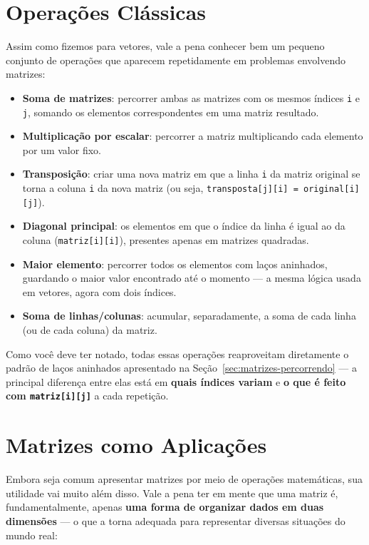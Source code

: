 \section{Operações Clássicas}
\label{sec:matrizes-operacoes}

Assim como fizemos para vetores, vale a pena conhecer bem um pequeno conjunto de operações que aparecem repetidamente em problemas envolvendo matrizes:

\begin{itemize}
    \item \textbf{Soma de matrizes}: percorrer ambas as matrizes com os mesmos índices \texttt{i} e \texttt{j}, somando os elementos correspondentes em uma matriz resultado.
    \item \textbf{Multiplicação por escalar}: percorrer a matriz multiplicando cada elemento por um valor fixo.
    \item \textbf{Transposição}: criar uma nova matriz em que a linha \texttt{i} da matriz original se torna a coluna \texttt{i} da nova matriz (ou seja, \texttt{transposta[j][i] = original[i][j]}).
    \item \textbf{Diagonal principal}: os elementos em que o índice da linha é igual ao da coluna (\texttt{matriz[i][i]}), presentes apenas em matrizes quadradas.
    \item \textbf{Maior elemento}: percorrer todos os elementos com laços aninhados, guardando o maior valor encontrado até o momento — a mesma lógica usada em vetores, agora com dois índices.
    \item \textbf{Soma de linhas/colunas}: acumular, separadamente, a soma de cada linha (ou de cada coluna) da matriz.
\end{itemize}

Como você deve ter notado, todas essas operações reaproveitam diretamente o padrão de laços aninhados apresentado na Seção~\ref{sec:matrizes-percorrendo} — a principal diferença entre elas está em \textbf{quais índices variam} e \textbf{o que é feito com \texttt{matriz[i][j]}} a cada repetição.

\section{Matrizes como Aplicações}

Embora seja comum apresentar matrizes por meio de operações matemáticas, sua utilidade vai muito além disso. Vale a pena ter em mente que uma matriz é, fundamentalmente, apenas \textbf{uma forma de organizar dados em duas dimensões} — o que a torna adequada para representar diversas situações do mundo real:

